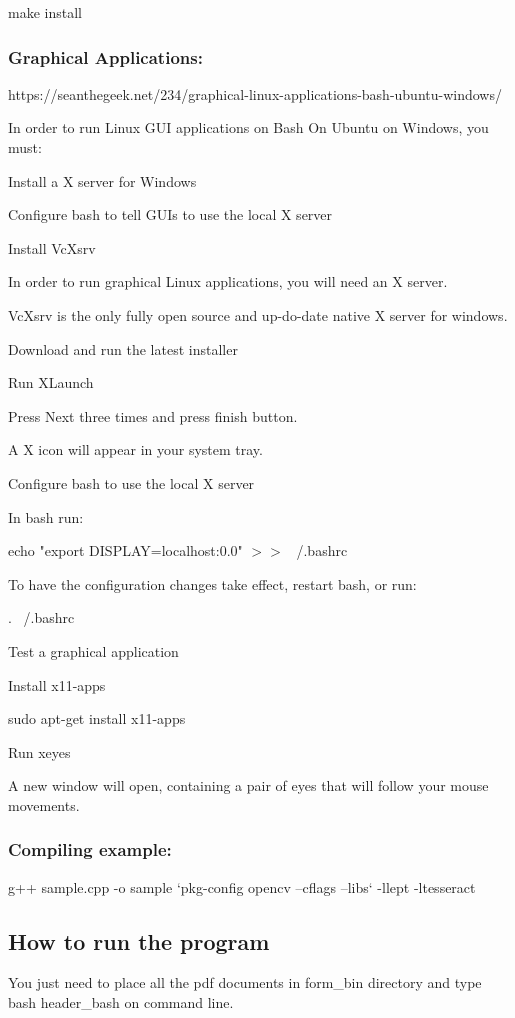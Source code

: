\documentclass[article, onecolumn, draftclsnofoot,10pt, compsoc]{IEEEtran}
\begin{document}
make install

\subsubsection{Graphical Applications:}

https://seanthegeek.net/234/graphical-linux-applications-bash-ubuntu-windows/

In order to run Linux GUI applications on Bash On Ubuntu on Windows, you must:
 
Install a X server for Windows

Configure bash to tell GUIs to use the local X server

Install VcXsrv

In order to run graphical Linux applications, you will need an X server.
 
VcXsrv is the only fully open source and up-do-date native X server for windows.
 
Download and run the latest installer

Run XLaunch

Press Next three times and press finish button.

A X icon will appear in your system tray.
 
Configure bash to use the local X server

In bash run:

echo "export DISPLAY=localhost:0.0" $>$$>$ ~/.bashrc

To have the configuration changes take effect, restart bash, or run:

. ~/.bashrc

Test a graphical application

Install x11-apps

sudo apt-get install x11-apps

Run xeyes

A new window will open, containing a pair of eyes that will follow your mouse movements.

\subsubsection{Compiling example:}

g++ sample.cpp -o sample `pkg-config opencv --cflags --libs` -llept -ltesseract

\subsection{How to run the program}
You just need to place all the pdf documents in form\_bin directory and type bash header\_bash on command line.
\end{document}
